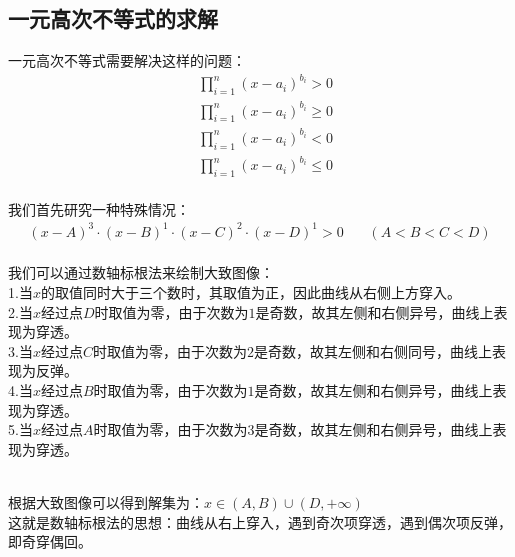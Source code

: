 \documentclass[UTF8]{ctexart}
\begin{document}
\subsection{一元高次不等式的求解}
    一元高次不等式需要解决这样的问题：
    \setcounter{equation}{0}
    \begin{align}
        &\prod_{i=1}^n(x-a_i)^{b_i}>0\\[3mm]
        &\prod_{i=1}^n(x-a_i)^{b_i}\geq 0\\[3mm]
        &\prod_{i=1}^n(x-a_i)^{b_i}<0\\[3mm]
        &\prod_{i=1}^n(x-a_i)^{b_i}\leq 0
    \end{align}\\
    我们首先研究一种特殊情况：
    \begin{align}
        (x-A)^3\cdot(x-B)^1\cdot(x-C)^2\cdot(x-D)^1>0~~~~~~~~(A<B<C<D)
    \end{align}\\
    我们可以通过数轴标根法来绘制大致图像：\\[3mm]
    1.当$x$的取值同时大于三个数时，其取值为正，因此曲线从右侧上方穿入。\\[3mm]
    2.当$x$经过点$D$时取值为零，由于次数为$1$是奇数，故其左侧和右侧异号，曲线上表现为穿透。\\[3mm]
    3.当$x$经过点$C$时取值为零，由于次数为$2$是奇数，故其左侧和右侧同号，曲线上表现为反弹。\\[3mm]
    4.当$x$经过点$B$时取值为零，由于次数为$1$是奇数，故其左侧和右侧异号，曲线上表现为穿透。\\[3mm]
    5.当$x$经过点$A$时取值为零，由于次数为$3$是奇数，故其左侧和右侧异号，曲线上表现为穿透。
    \begin{figure}[h]
        \begin{center}
        \end{center}
    \end{figure}\\
    根据大致图像可以得到解集为：$x\in(A,B)\cup(D,+\infty)$\\[3mm]
    这就是数轴标根法的思想：曲线从右上穿入，遇到奇次项穿透，遇到偶次项反弹，即奇穿偶回。
    
\end{document}
